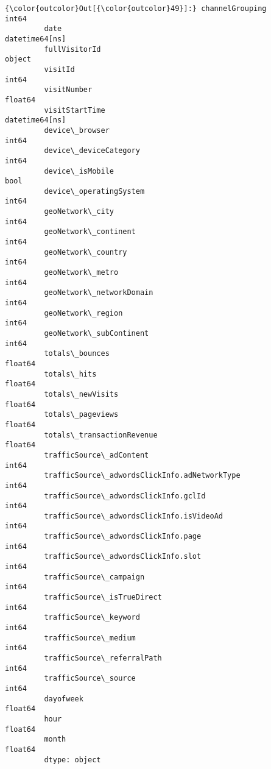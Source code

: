 \documentclass[11pt]{article}
\begin{document}
\begin{Verbatim}[commandchars=\\\{\}]
{\color{outcolor}Out[{\color{outcolor}49}]:} channelGrouping                                          int64
         date                                            datetime64[ns]
         fullVisitorId                                           object
         visitId                                                  int64
         visitNumber                                            float64
         visitStartTime                                  datetime64[ns]
         device\_browser                                           int64
         device\_deviceCategory                                    int64
         device\_isMobile                                           bool
         device\_operatingSystem                                   int64
         geoNetwork\_city                                          int64
         geoNetwork\_continent                                     int64
         geoNetwork\_country                                       int64
         geoNetwork\_metro                                         int64
         geoNetwork\_networkDomain                                 int64
         geoNetwork\_region                                        int64
         geoNetwork\_subContinent                                  int64
         totals\_bounces                                         float64
         totals\_hits                                            float64
         totals\_newVisits                                       float64
         totals\_pageviews                                       float64
         totals\_transactionRevenue                              float64
         trafficSource\_adContent                                  int64
         trafficSource\_adwordsClickInfo.adNetworkType             int64
         trafficSource\_adwordsClickInfo.gclId                     int64
         trafficSource\_adwordsClickInfo.isVideoAd                 int64
         trafficSource\_adwordsClickInfo.page                      int64
         trafficSource\_adwordsClickInfo.slot                      int64
         trafficSource\_campaign                                   int64
         trafficSource\_isTrueDirect                               int64
         trafficSource\_keyword                                    int64
         trafficSource\_medium                                     int64
         trafficSource\_referralPath                               int64
         trafficSource\_source                                     int64
         dayofweek                                              float64
         hour                                                   float64
         month                                                  float64
         dtype: object
\end{Verbatim}
            
\end{document}
